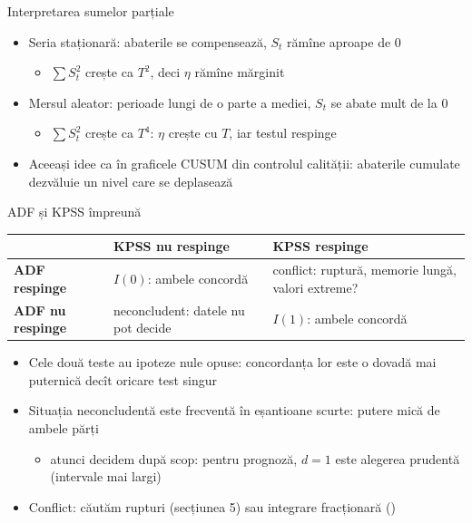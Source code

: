 \begin{frame}{Interpretarea sumelor parțiale}
\itemsize{\small}
\begin{itemize}
    \item Seria staționară: abaterile se compensează, $S_t$ rămîne aproape de 0
    \begin{itemize}
        \item $\sum S_t^2$ crește ca $T^2$, deci $\eta$ rămîne mărginit
    \end{itemize}
    \item Mersul aleator: perioade lungi de o parte a mediei, $S_t$ se abate mult de la 0
    \begin{itemize}
        \item $\sum S_t^2$ crește ca $T^4$: $\eta$ crește cu $T$, iar testul respinge
    \end{itemize}
    \item Aceeași idee ca în graficele CUSUM din controlul calității: abaterile cumulate dezvăluie un nivel care se deplasează
\end{itemize}
\end{frame}

\begin{frame}{ADF și KPSS împreună}
\itemsize{\small}
\begin{center}
\footnotesize
\begin{tabular}{lll}
\toprule
& \textbf{KPSS nu respinge} & \textbf{KPSS respinge} \\
\midrule
\textbf{ADF respinge} & $I(0)$: ambele concordă & conflict: ruptură, memorie lungă, valori extreme? \\
\textbf{ADF nu respinge} & neconcludent: datele nu pot decide & $I(1)$: ambele concordă \\
\bottomrule
\end{tabular}
\end{center}
\begin{itemize}
    \item Cele două teste au ipoteze nule opuse: concordanța lor este o dovadă mai puternică decît oricare test singur
    \item Situația neconcludentă este frecventă în eșantioane scurte: putere mică de ambele părți
    \begin{itemize}
        \item atunci decidem după scop: pentru prognoză, $d = 1$ este alegerea prudentă (intervale mai largi)
    \end{itemize}
    \item Conflict: căutăm rupturi (secțiunea 5) sau integrare fracționară ()
\end{itemize}
\end{frame}

